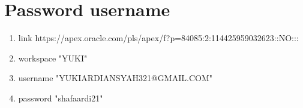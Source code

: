 \documentclass{article}
\begin{document}
\section{Password username}
      
      \begin{enumerate}
      \item link https://apex.oracle.com/pls/apex/f?p=84085:2:114425959032623::NO:::
          \item workspace "YUKI"
          
          \item username "YUKIARDIANSYAH321@GMAIL.COM"
          
          \item password "shafaardi21"
      \end{enumerate}
      
       
\end{document}
